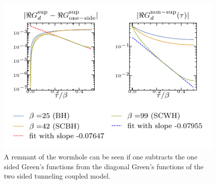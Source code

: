 \begin{figure}[t]
    \centering
    \includegraphics[width=\linewidth]{figures/chapter3/diffG.pdf} %
    \caption{A remnant of the wormhole can be seen if one subtracts the one sided Green's functions from the diagonal Green's functions of the two sided tunneling coupled model.}
    \label{fig:subleading-Sc}
\end{figure}

